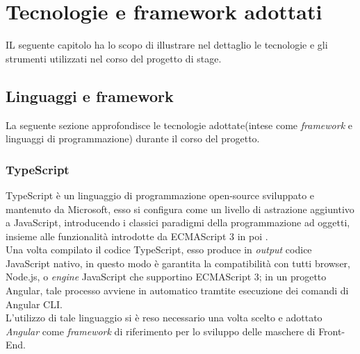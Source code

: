 
\chapter{Tecnologie e framework adottati}
\label{cap:tecnologie-progettazione}
IL seguente capitolo ha lo scopo di illustrare nel dettaglio le tecnologie e gli strumenti utilizzati nel corso del progetto di stage.

\section{Linguaggi e framework}
La seguente sezione approfondisce le tecnologie adottate(intese come \textit{framework} e linguaggi di programmazione) durante il corso del progetto.

\subsection{TypeScript}\label{typescript}
\gls{TypeScript} è un linguaggio di programmazione open-source sviluppato e mantenuto da Microsoft, esso si configura come un livello di astrazione aggiuntivo a \gls{JavaScript}, introducendo i classici paradigmi della programmazione ad oggetti, insieme alle funzionalità introdotte da ECMAScript 3 in poi .\\
Una volta compilato il codice TypeScript, esso produce in \textit{output} codice JavaScript nativo, in questo modo è garantita la compatibilità con tutti browser, \gls{Node.js}, o \textit{engine} JavaScript che supportino ECMAScript 3; in un progetto Angular, tale processo avviene in automatico tramtite esecuzione dei comandi di \gls{Angular CLI}.\\
L'utilizzo di tale linguaggio si è reso necessario una volta scelto e adottato \textit{Angular} come \textit{framework} di riferimento per lo sviluppo delle maschere di Front-End.\\
\newpage

